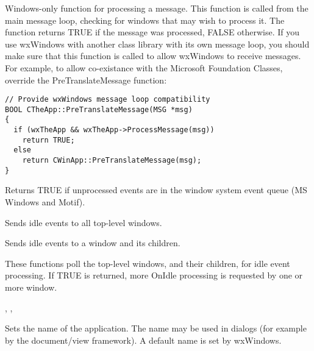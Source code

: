 
Windows-only function for processing a message. This function
is called from the main message loop, checking for windows that
may wish to process it. The function returns TRUE if the message
was processed, FALSE otherwise. If you use wxWindows with another class
library with its own message loop, you should make sure that this
function is called to allow wxWindows to receive messages. For example,
to allow co-existance with the Microsoft Foundation Classes, override
the PreTranslateMessage function:

\begin{verbatim}
// Provide wxWindows message loop compatibility
BOOL CTheApp::PreTranslateMessage(MSG *msg)
{
  if (wxTheApp && wxTheApp->ProcessMessage(msg))
    return TRUE;
  else
    return CWinApp::PreTranslateMessage(msg);
}
\end{verbatim}

\label{wxapppending}


Returns TRUE if unprocessed events are in the window system event queue
(MS Windows and Motif).



\label{wxappsendidleevents}


Sends idle events to all top-level windows.


Sends idle events to a window and its children.


These functions poll the top-level windows, and their children, for idle event processing.
If TRUE is returned, more OnIdle processing is requested by one or more window.


, , 

\label{wxappsetappname}


Sets the name of the application. The name may be used in dialogs
(for example by the document/view framework). A default name is set by
wxWindows.

